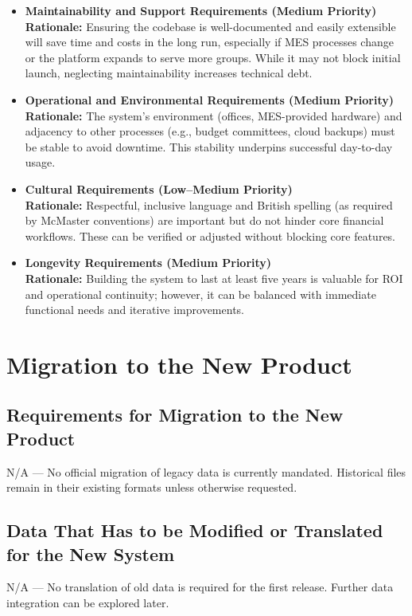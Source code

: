 \documentclass[12pt]{article}
\begin{document}
\begin{itemize}
    \item \textbf{Maintainability and Support Requirements (Medium Priority)} \\
    \textbf{Rationale:} Ensuring the codebase is well-documented and easily extensible will save time and costs in the long run, especially if MES processes change or the platform expands to serve more groups. While it may not block initial launch, neglecting maintainability increases technical debt.

    \item \textbf{Operational and Environmental Requirements (Medium Priority)} \\
    \textbf{Rationale:} The system’s environment (offices, MES-provided hardware) and adjacency to other processes (e.g., budget committees, cloud backups) must be stable to avoid downtime. This stability underpins successful day-to-day usage.

    \item \textbf{Cultural Requirements (Low–Medium Priority)} \\
    \textbf{Rationale:} Respectful, inclusive language and British spelling (as required by McMaster conventions) are important but do not hinder core financial workflows. These can be verified or adjusted without blocking core features.

    \item \textbf{Longevity Requirements (Medium Priority)} \\
    \textbf{Rationale:} Building the system to last at least five years is valuable for ROI and operational continuity; however, it can be balanced with immediate functional needs and iterative improvements.

\end{itemize}

\section{Migration to the New Product}
\subsection{Requirements for Migration to the New Product}
N/A --- No official migration of legacy data is currently mandated. Historical files remain in their existing formats unless otherwise requested.

\subsection{Data That Has to be Modified or Translated for the New System}
N/A --- No translation of old data is required for the first release. Further data integration can be explored later.
\end{document}
